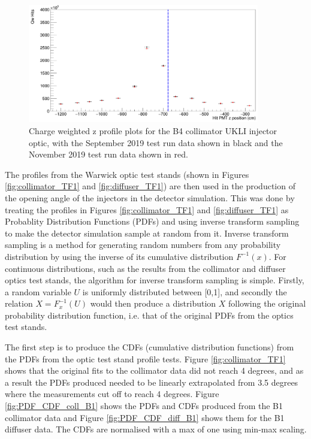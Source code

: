 \begin{figure}
    \centering
    \includegraphics[width=0.9\textwidth]{Figures/charge_weighted_nov_sept_B4.PNG}
    \caption{Charge weighted z profile plots for the B4 collimator UKLI injector optic, with the September 2019 test run data shown in black and the November 2019 test run data shown in red.}
    \label{fig:charge_weighted_nov_sept_B4}
\end{figure}


The profiles from the Warwick optic test stands (shown in Figures \ref{fig:collimator_TF1} and \ref{fig:diffuser_TF1}) are then used in the production of the opening angle of the injectors in the detector simulation. This was done by treating the profiles in Figures \ref{fig:collimator_TF1} and \ref{fig:diffuser_TF1} as Probablity Distribution Functions (PDFs) and using inverse transform sampling to make the detector simulation sample at random from it. Inverse transform sampling is a method for generating random numbers from any probability distribution by using the inverse of its cumulative distribution $F^{-1}(x)$. For continuous distributions, such as the results from the collimator and diffuser optics test stands, the algorithm for inverse transform sampling is simple. Firstly, a random variable $U$ is uniformly distributed between [0,1], and secondly the relation $X = F^{-1}_{x}(U)$ would then produce a distribution $X$ following the original probability distribution function, i.e. that of the original PDFs from the optics test stands. 

The first step is to produce the CDFs (cumulative distribution functions) from the PDFs from the optic test stand profile tests. Figure \ref{fig:collimator_TF1} shows that the original fits to the collimator data did not reach 4 degrees, and as a result the PDFs produced needed to be linearly extrapolated from 3.5 degrees where the measurements cut off to reach 4 degrees. Figure \ref{fig:PDF_CDF_coll_B1} shows the PDFs and CDFs produced from the B1 collimator data and Figure \ref{fig:PDF_CDF_diff_B1} shows them for the B1 diffuser data. The CDFs are normalised with a max of one using min-max scaling.


